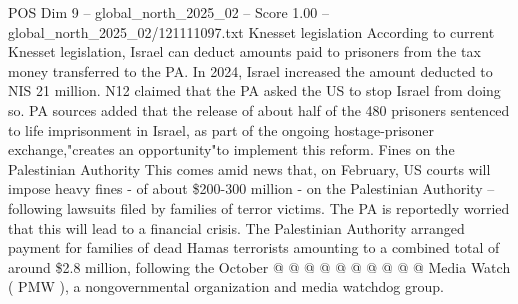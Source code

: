 \begin{textsample}{POS Dim 9 – global\_north\_2025\_02 – Score 1.00 – global\_north\_2025\_02/121111097.txt}
Knesset legislation According to current Knesset legislation, Israel can deduct amounts paid to prisoners from the tax money transferred to the PA.
In 2024, Israel increased the amount deducted to NIS 21 million.
N12 claimed that the PA asked the US to stop Israel from doing so.
PA sources added that the release of about half of the 480 prisoners sentenced to life imprisonment in Israel, as part of the ongoing hostage-prisoner exchange,"creates an opportunity"to implement this reform.
Fines on the Palestinian Authority This comes amid news that, on February, US courts will impose heavy fines - of about \$200-300 million - on the Palestinian Authority -- following lawsuits filed by families of terror victims.
The PA is reportedly worried that this will lead to a financial crisis.
The Palestinian Authority arranged payment for families of dead Hamas terrorists amounting to a combined total of around \$2.8 million, following the October @ @ @ @ @ @ @ @ @ @ Media Watch ( PMW ), a nongovernmental organization and media watchdog group.

\end{textsample}
